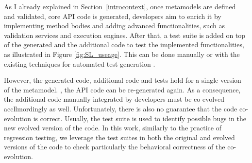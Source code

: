 %
%
As I already explained in Section~\ref{introcontext}, once metamodels are defined and validated, core API code is generated, developers aim to enrich it by implementing method bodies and adding advanced functionalities, such as validation services and execution engines. After that, a test suite is added on top of the generated and the additional code to test the implemented functionalities, as illustrated in Figure \ref{fig:SL_useage}. This can be done manually or with the existing techniques for automated test generation \cite{fraser2011evosuite,mcminn2004search,beyer2022advances}. 

However, the generated code, additional code and tests hold for a single version of the metamodel. 
, the API code can be re-generated again. As a consequence, the additional code manually integrated by developers must be co-evolved accllmordingly as well. 
Unfortunately, there is also no guarantee that the code co-evolution is correct. 
Usually, the test suite is used to identify possible bugs in the new evolved version of the code. In this work, similarly to the practice of regression testing, we leverage the test suites in both the original and evolved versions of the code to check particularly the behavioral correctness of the co-evolution.

